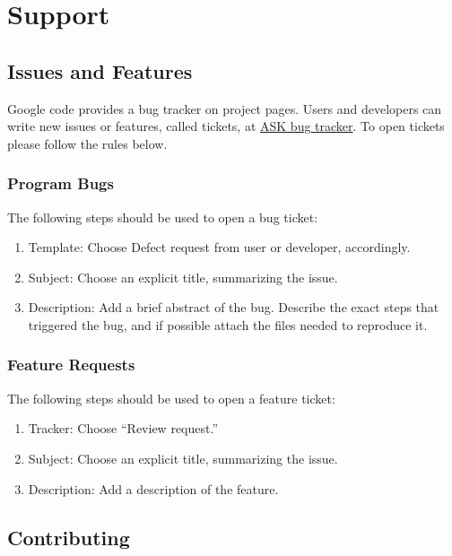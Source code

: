 \chapter{Support}
\section{Issues and Features}

Google code provides a bug tracker on project pages. Users and developers can write new issues or features, called tickets, at \href{http://code.google.com/p/adaptive-sampling-kit/issues/list}{ASK bug tracker}. To open tickets please follow the rules below.

\subsection{Program Bugs}

The following steps should be used to open a bug ticket:

\begin{enumerate}
	\item Template: Choose Defect request from user or developer, accordingly.
	\item Subject: Choose an explicit title, summarizing the issue.
	\item Description: Add a brief abstract of the bug. Describe the exact steps that triggered the bug, and if possible attach the files needed to reproduce it.
\end{enumerate}

\subsection{Feature Requests}

The following steps should be used to open a feature ticket:

\begin{enumerate}
	\item Tracker: Choose ``Review request.''
	\item Subject: Choose an explicit title, summarizing the issue.
	\item Description: Add a description of the feature.
\end{enumerate}

\section{Contributing}

